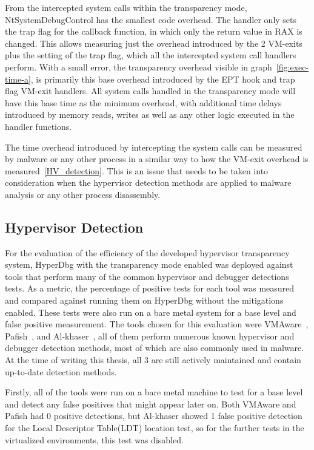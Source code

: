 From the intercepted system calls within the transparency mode, NtSystemDebugControl has the smallest code overhead. 
The handler only sets the trap flag for the callback function, in which only the return value in RAX is changed. 
This allows measuring just the overhead introduced by the 2 VM-exits plus the setting of the trap flag, which all the intercepted system call handlers perform. 
With a small error, the transparency overhead visible in graph~\ref{fig:exec-time-a}, is primarily this base overhead introduced by the EPT hook and trap flag VM-exit handlers. 
All system calls handled in the transparency mode will have this base time as the minimum overhead, with additional time delays introduced by memory reads, writes 
as well as any other logic executed in the handler functions.

The time overhead introduced by intercepting the system calls can be measured by malware or any other process in a similar way to how the VM-exit overhead is measured~\ref{HV_detection}. 
This is an issue that needs to be taken into consideration when the hypervisor detection methods are applied to malware analysis or any other process disassembly.

\subsection{Hypervisor Detection}\label{HV-detection-eval}
For the evaluation of the efficiency of the developed hypervisor transparency system, HyperDbg with the transparency mode enabled was deployed against tools that perform many of 
the common hypervisor and debugger detections tests. As a metric, the percentage of positive tests for each tool was measured and compared against running them on HyperDbg 
without the mitigations enabled. These tests were also run on a bare metal system for a base level and false positive measurement. 
The tools chosen for this evaluation were VMAware~\cite{vmaware}, Pafish~\cite{pafish}, and Al-khaser~\cite{al-khaser}, all of them perform numerous known hypervisor and debugger detection methods, 
most of which are also commonly used in malware. At the time of writing this thesis, all 3 are still actively maintained and contain up-to-date detection methods.

Firstly, all of the tools were run on a bare metal machine to test for a base level and detect any false positives that might appear later on. 
Both VMAware and Pafish had 0 positive detections, but Al-khaser showed 1 false positive detection for the Local Descriptor Table(LDT) location test, 
so for the further tests in the virtualized environments, this test was disabled.

